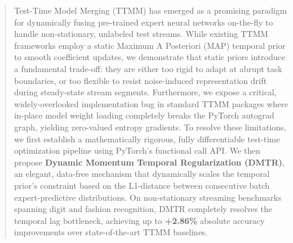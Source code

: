 \documentclass{article}
\begin{document}

\printAffiliationsAndNotice{\icmlEqualContribution}

\begin{abstract}
Test-Time Model Merging (TTMM) has emerged as a promising paradigm for dynamically fusing pre-trained expert neural networks on-the-fly to handle non-stationary, unlabeled test streams. While existing TTMM frameworks employ a static Maximum A Posteriori (MAP) temporal prior to smooth coefficient updates, we demonstrate that static priors introduce a fundamental trade-off: they are either too rigid to adapt at abrupt task boundaries, or too flexible to resist noise-induced representation drift during steady-state stream segments. Furthermore, we expose a critical, widely-overlooked implementation bug in standard TTMM packages where in-place model weight loading completely breaks the PyTorch autograd graph, yielding zero-valued entropy gradients. 
To resolve these limitations, we first establish a mathematically rigorous, fully differentiable test-time optimization pipeline using PyTorch's functional call API. We then propose \textbf{Dynamic Momentum Temporal Regularization (DMTR)}, an elegant, data-free mechanism that dynamically scales the temporal prior's constraint based on the L1-distance between consecutive batch expert-predictive distributions. On non-stationary streaming benchmarks spanning digit and fashion recognition, DMTR completely resolves the temporal lag bottleneck, achieving up to \textbf{+2.86\%} absolute accuracy improvements over state-of-the-art TTMM baselines.
\end{abstract}
\end{document}
